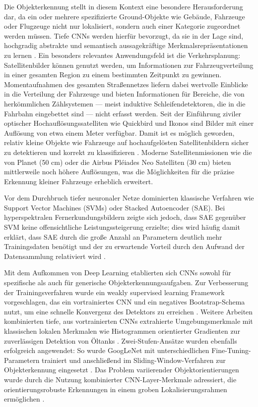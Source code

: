 Die Objekterkennung stellt in diesem Kontext eine besondere Herausforderung dar, da ein oder mehrere spezifizierte Ground-Objekte wie Gebäude, Fahrzeuge oder Flugzeuge nicht nur lokalisiert, sondern auch einer Kategorie zugeordnet werden müssen. Tiefe CNNs werden hierfür bevorzugt, da sie in der Lage sind, hochgradig abstrakte und semantisch aussagekräftige Merkmalsrepräsentationen zu lernen \cite{Zhu2017}. Ein besonders relevantes Anwendungsfeld ist die Verkehrsplanung: Satellitenbilder können genutzt werden, um Informationen zur Fahrzeugverteilung in einer gesamten Region zu einem bestimmten Zeitpunkt zu gewinnen. Momentaufnahmen des gesamten Straßennetzes liefern dabei wertvolle Einblicke in die Verteilung der Fahrzeuge und bieten Informationen für Bereiche, die von herkömmlichen Zählsystemen — meist induktive Schleifendetektoren, die in die Fahrbahn eingebettet sind — nicht erfasst werden. Seit der Einführung ziviler optischer Hochauflösungssatelliten wie Quickbird und Ikonos sind Bilder mit einer Auflösung von etwa einem Meter verfügbar. Damit ist es möglich geworden, relativ kleine Objekte wie Fahrzeuge auf hochaufgelösten Satellitenbildern sicher zu detektieren und korrekt zu klassifizieren \cite{Eikvil2009}. Moderne Satellitenmissionen wie die von Planet (50 cm) \cite{planet_labs} oder die Airbus Pléiades Neo Satelliten (30 cm) \cite{airbus_neo} bieten mittlerweile noch höhere Auflösungen, was die Möglichkeiten für die präzise Erkennung kleiner Fahrzeuge erheblich erweitert.

Vor dem Durchbruch tiefer neuronaler Netze dominierten klassische Verfahren wie Support Vector Machines (SVMs) oder Stacked Autoencoder (SAE). Bei hyperspektralen Fernerkundungsbildern zeigte sich jedoch, dass SAE gegenüber SVM keine offensichtliche Leistungssteigerung erzielte; dies wird häufig damit erklärt, dass SAE durch die große Anzahl an Parametern deutlich mehr Trainingsdaten benötigt und der zu erwartende Vorteil durch den Aufwand der Datensammlung relativiert wird \cite{Liu2017}.

Mit dem Aufkommen von Deep Learning etablierten sich CNNs sowohl für spezifische als auch für generische Objekterkennungsaufgaben. Zur Verbesserung der Trainingsverfahren wurde ein weakly supervised learning Framework vorgeschlagen, das ein vortrainiertes CNN und ein negatives Bootstrap-Schema nutzt, um eine schnelle Konvergenz des Detektors zu erreichen \cite{Zhou2016}. Weitere Arbeiten kombinierten tiefe, aus vortrainierten CNNs extrahierte Umgebungsmerkmale mit klassischen lokalen Merkmalen wie Histogrammen orientierter Gradienten \cite{Dalal2005} zur zuverlässigen Detektion von Öltanks \cite{Zhang2015}. Zwei-Stufen-Ansätze wurden ebenfalls erfolgreich angewendet: So wurde GoogLeNet mit unterschiedlichen Fine-Tuning-Parametern trainiert und anschließend im Sliding-Window-Verfahren zur Objekterkennung eingesetzt \cite{Sevo2016}. Das Problem variierender Objektorientierungen wurde durch die Nutzung kombinierter CNN-Layer-Merkmale adressiert, die orientierungsrobuste Erkennungen in einem groben Lokalisierungsrahmen ermöglichen \cite{Zhu2015}.


